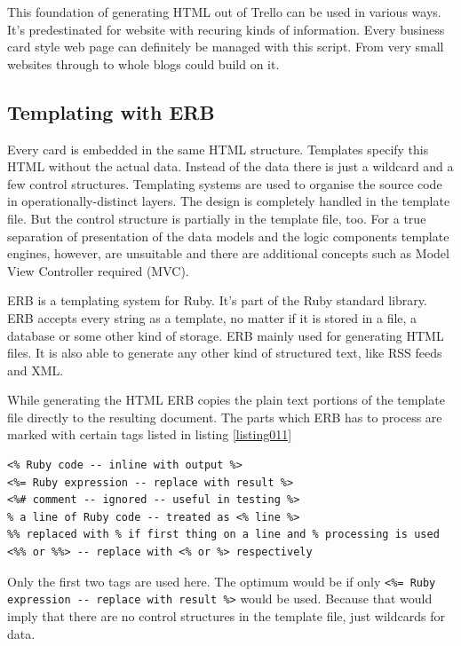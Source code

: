 This foundation of generating HTML out of Trello can be used in various ways. It's predestinated for website with recuring kinds of information. Every business card style web page can definitely be managed with this script. From very small websites through to whole blogs could build on it.

\subsection{Templating with ERB}
Every card is embedded in the same HTML structure. Templates specify this HTML without the actual data. Instead of the data there is just a wildcard and a few control structures. Templating systems are used to organise the source code in operationally-distinct layers. The design is completely handled in the template file. But the control structure is partially in the template file, too. For a true separation of presentation of the data models and the logic components template engines, however, are unsuitable and there are additional concepts such as Model View Controller required (MVC).

ERB is a templating system for Ruby. It's part of the Ruby standard library. ERB accepts every string as a template, no matter if it is stored in a file, a database or some other kind of storage. ERB mainly used for generating HTML files. It is also able to generate any other kind of structured text, like RSS feeds and XML. \cite{erb:introduction} \cite{erb:docu}

While generating the HTML ERB copies the plain text portions of the template file directly to the resulting document.  The parts which ERB has to process are marked with certain tags listed in listing \ref{listing011}
\begin{lstlisting}[aboveskip=1\baselineskip, style=bash, caption=Recognised tags in ERB., label=listing011]
<% Ruby code -- inline with output %>
<%= Ruby expression -- replace with result %>
<%# comment -- ignored -- useful in testing %>
% a line of Ruby code -- treated as <% line %> 
%% replaced with % if first thing on a line and % processing is used
<%% or %%> -- replace with <% or %> respectively
\end{lstlisting}
Only the first two tags are used here. The optimum would be if only \lstinline{<%= Ruby expression -- replace with result %>} would be used. Because that would imply that there are no control structures in the template file, just wildcards for data.


